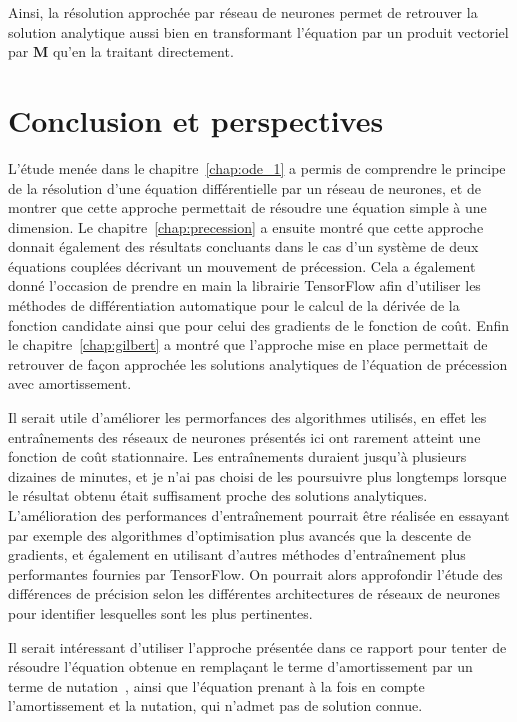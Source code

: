 \documentclass[12pt]{report}
\begin{document}
Ainsi, la résolution approchée par réseau de neurones permet de retrouver la solution analytique aussi bien en transformant l'équation par un produit vectoriel par $\bm M$ qu'en la traitant directement.

\chapter{Conclusion et perspectives}
\label{chap:conclusion}

L'étude menée dans le chapitre~\ref{chap:ode_1} a permis de comprendre le principe de la résolution d'une équation différentielle par un réseau de neurones, et de montrer que cette approche permettait de résoudre une équation simple à une dimension.
Le chapitre~\ref{chap:precession} a ensuite montré que cette approche donnait également des résultats concluants dans le cas d'un système de deux équations couplées décrivant un mouvement de précession.
Cela a également donné l'occasion de prendre en main la librairie TensorFlow afin d'utiliser les méthodes de différentiation automatique pour le calcul de la dérivée de la fonction candidate ainsi que pour celui des gradients de le fonction de coût.
Enfin le chapitre~\ref{chap:gilbert} a montré que l'approche mise en place permettait de retrouver de façon approchée les solutions analytiques de l'équation de précession avec amortissement.


Il serait utile d'améliorer les permorfances des algorithmes utilisés, en effet les entraînements des réseaux de neurones présentés ici ont rarement atteint une fonction de coût stationnaire. 
Les entraînements duraient jusqu'à plusieurs dizaines de minutes, et je n'ai pas choisi de les poursuivre plus longtemps lorsque le résultat obtenu était suffisament proche des solutions analytiques. 
L'amélioration des performances d'entraînement pourrait être réalisée en essayant par exemple des algorithmes d'optimisation plus avancés que la descente de gradients, et également en utilisant d'autres méthodes d'entraînement plus performantes fournies par TensorFlow.
On pourrait alors approfondir l'étude des différences de précision selon les différentes architectures de réseaux de neurones pour identifier lesquelles sont les plus pertinentes.

Il serait intéressant d'utiliser l'approche présentée dans ce rapport pour tenter de résoudre l'équation obtenue en remplaçant le terme d'amortissement par un terme de nutation~\cite{Neeraj2021}, ainsi que l'équation prenant à la fois en compte l'amortissement et la nutation, qui n'admet pas de solution connue.
\end{document}
